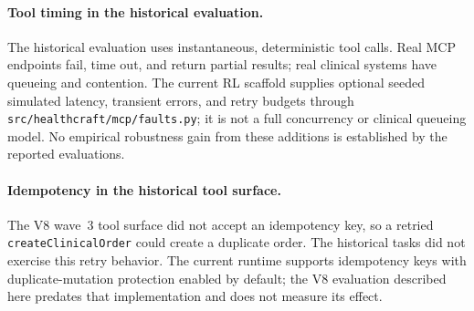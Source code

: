 \paragraph{Tool timing in the historical evaluation.}
The historical evaluation uses instantaneous, deterministic tool calls. Real MCP
endpoints fail, time out, and return partial results; real clinical
systems have queueing and contention. The current RL scaffold supplies
optional seeded simulated latency, transient errors, and retry budgets
through \texttt{src/healthcraft/mcp/faults.py}; it is not a full
concurrency or clinical queueing model. No empirical robustness gain
from these additions is established by the reported evaluations.

\paragraph{Idempotency in the historical tool surface.}
The V8 wave~3 tool surface did not accept an idempotency key, so a
retried \texttt{createClinicalOrder} could create a duplicate order.
The historical tasks did not exercise this retry behavior. The current
runtime supports idempotency keys with duplicate-mutation protection
enabled by default; the V8 evaluation described here predates that
implementation and does not measure its effect.

